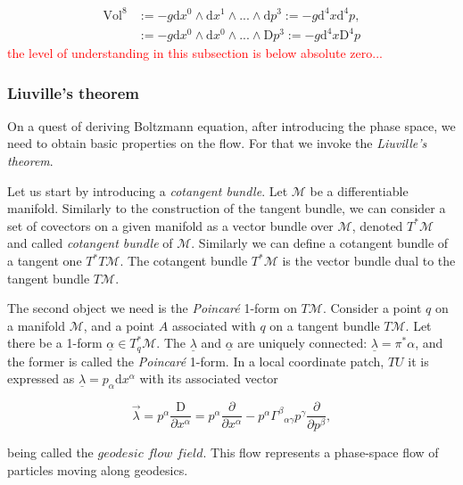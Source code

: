 \documentclass[11pt,a4paper,headinclude=true,DIV=14,BCOR=8mm,chapterprefix,listof=totoc,twoside,openright,abstracton]{scrbook}
\newcommand{\red}[1]{\textcolor{red}{#1}}
\begin{document}
\begin{align}
\text{Vol}^8 &:= -g \text{d}x^{0} \wedge \text{d}x^{1} \wedge ... \wedge \text{d}p^{3} := - g\text{d}^{4}x \text{d}^{4}p, \\
&:= -g \text{d}x^{0} \wedge \text{d}x^{0} \wedge ... \wedge \text{D}p^{3} :=-g \text{d}^{4}x\text{D}^4 p
\label{eq:theory:8form}
\end{align}
\red{the level of understanding in this subsection is below absolute zero...}

\subsubsection{Liuville's theorem}

On a quest of deriving Boltzmann equation, after introducing the phase space, we need to obtain basic properties on the flow. For that we invoke the \textit{Liuville's theorem}.

Let us start by introducing a \textit{cotangent bundle}. Let $\mathcal{M}$ be a differentiable manifold. Similarly to the construction of the tangent bundle, we can consider a set of covectors on a given manifold as a vector bundle over $\mathcal{M}$, denoted $T^*\mathcal{M}$ and called \textit{cotangent bundle} of $\mathcal{M}$. Similarly we can define a cotangent bundle of a tangent one $T^*T\mathcal{M}$. The cotangent bundle $T^*\mathcal{M}$ is the vector bundle dual to the tangent bundle $T\mathcal{M}$. 

The second object we need is the \textit{Poincar\'{e}} 1-form on $T\mathcal{M}$. Consider a point $q$ on a manifold $\mathcal{M}$, and a point $A$ associated with $q$ on a tangent bundle $T\mathcal{M}$. Let there be a 1-form $\underline{\alpha}\in T^* _q\mathcal{M}$. The $\underline{\lambda}$ and $\underline{\alpha}$ are uniquely connected: $\underline{\lambda} = \pi^* \alpha$, and the former is called the \textit{Poincar\'{e}} 1-form. In a local coordinate patch, $TU$ it is expressed as $\underline{\lambda} = p_{\alpha} \text{d}x^{\alpha}$ with its associated vector

\begin{equation}
    \vec{\lambda} = p^{\alpha} \frac{\text{D}}{\partial x^{\alpha}} = p^{\alpha}\frac{\partial}{\partial x^{\alpha}} - p^{\alpha}{\Gamma^{\beta}}_{\alpha\gamma}p^{\gamma}\frac{\partial}{\partial p^{\beta}},
\end{equation}

being called the $\textit{geodesic flow field}$. This flow represents a phase-space flow of particles moving along geodesics.
\end{document}
